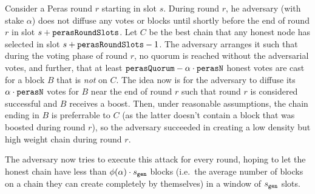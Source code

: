 Consider a Peras round $r$ starting in slot $s$.
During round $r$, he adversary (with stake $\alpha$) does not diffuse any votes or blocks until shortly before the end of round $r$ in slot $s+\mathtt{perasRoundSlots}$.
Let $C$ be the best chain that any honest node has selected in slot $s+\mathtt{perasRoundSlots}-1$.
The adversary arranges it such that during the voting phase of round $r$, no quorum is reached without the adversarial votes, and further, that at least $\mathtt{perasQuorum} - \alpha\cdot \mathtt{perasN}$ honest votes are cast for a block $B$ that is \emph{not} on $C$.
The idea now is for the adversary to diffuse its $\alpha\cdot\mathtt{perasN}$ votes for $B$ near the end of round $r$ such that round $r$ is considered successful and $B$ receives a boost.
Then, under reasonable assumptions, the chain ending in $B$ is preferrable to $C$ (as the latter doesn't contain a block that was boosted during round $r$), so the adversary succeeded in creating a low density but high weight chain during round $r$.

The adversary now tries to execute this attack for every round, hoping to let the honest chain have less than $\phi(\alpha) \cdot s_{\mathtt{gen}}$ blocks (i.e.\ the average number of blocks on a chain they can create completely by themselves) in a window of $s_{\mathtt{gen}}$ slots.

